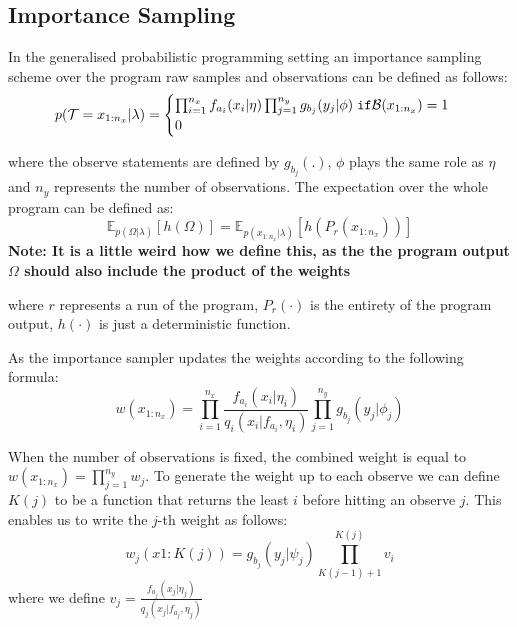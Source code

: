 \documentclass{article}
\begin{document}
\subsection{Importance Sampling}
In the generalised probabilistic programming setting an importance sampling scheme over the 
program raw samples and observations can be defined as follows:
\begin{equation}
  \label{eq:posterior}
  p(\mathcal{T}=x_{1:n_x}| \lambda)=
  \begin{cases}
  \prod_{i=1}^{n_x} f_{a_i}(x_i | \eta) \prod_{j=1}^{n_y} g_{b_j}(y_j | \phi) \hspace{0.1cm} \texttt{if} \mathcal{B}(x_{1:n_x}) = 1\\
  0
  \end{cases}
\end{equation}

where the observe statements are defined by $g_{b_j}(.)$, $\phi$ plays the same role as 
$\eta$ and $n_y$ represents the number of observations.
The expectation over the whole program can be defined as: 
\begin{equation}
\mathbb{E}_{p(\Omega | \lambda)}[h(\Omega)] = \mathbb{E}_{p(x_{1:n_x} | \lambda)}[h(P_r(x_{1:n_x}))]
\end{equation}
\textbf{Note: It is a little weird how we define this, as the the program output $\Omega$ should
also include the product of the weights}

where $r$ represents a run of the program, $P_{r}(\cdot)$ is the entirety of the program output,
$h(\cdot)$ is just a deterministic function. 

As the importance sampler updates the weights according to the following formula:
\begin{equation}
  w(x_{1:n_x}) = \prod^{n_x}_{i=1}\frac{f_{a_i}(x_i | \eta_i)}{q_i(x_i |f_{a_i}, \eta_i)} \prod^{n_y}_{j=1} g_{b_j}(y_j | \phi_j)
\end{equation}

When the number of observations is fixed, the combined weight is equal to $w(x_{1:n_x}) = \prod^{n_y}_{j=1} w_j $. 
To generate the weight up to each observe we can define $K(j)$ to be a function that returns the least $i$ before hitting an observe $j$.
This enables us to write the $j$-th weight as follows:
\begin{equation}
  w_j(x1:K(j)) = g_{b_j}(y_j | \psi_j) \prod^{K(j)}_{K(j-1)+1} v_i
\end{equation}
where we define $v_j = \frac{f_{a_j}(x_j | \eta_j)}{q_j(x_j |f_{a_j}, \eta_j)}$
\end{document}
